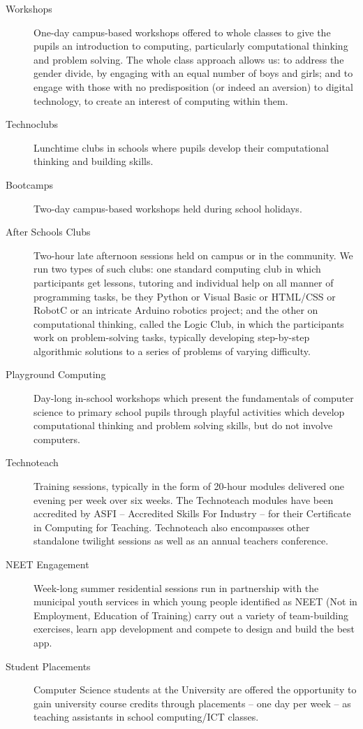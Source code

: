 \documentclass{sig-alternate}
\begin{document}
\begin{description}
\item[Workshops]
One-day campus-based workshops offered to whole classes
to give the pupils an introduction to computing,
particularly computational thinking and problem solving.
The whole class approach allows us: to address the gender divide,
by engaging with an equal number of boys and girls;
and to engage with those with no predisposition (or indeed an aversion)
to digital technology, to create an interest of computing within them.
\item[Technoclubs]
Lunchtime clubs in schools where pupils develop
their computational thinking and building skills.
\item[Bootcamps]
Two-day campus-based workshops held during school holidays.
\item[After Schools Clubs]
Two-hour late afternoon sessions held on campus or in the community.
We run two types of such clubs: one standard computing club
in which participants get lessons, tutoring and individual help
on all manner of programming tasks, be they Python or Visual Basic
or HTML/CSS or RobotC or an intricate Arduino robotics project;
and the other on computational thinking, called the Logic Club,
in which the participants work on problem-solving tasks,
typically developing step-by-step algorithmic solutions
to a series of problems of varying difficulty.
\item[Playground Computing]
Day-long in-school workshops which present
the fundamentals of computer science to primary school pupils
through playful activities which develop computational thinking
and problem solving skills, but do not involve computers.
\item[Technoteach]
Training sessions, typically in the form of 20-hour modules
delivered one evening per week over six weeks.
The Technoteach modules have been accredited by ASFI
-- Accredited Skills For Industry --
for their Certificate in Computing for Teaching.
Technoteach also encompasses other standalone twilight sessions
as well as an annual teachers conference.
\item[NEET Engagement]
Week-long summer residential sessions run in partnership with
the municipal youth services in which young people identified
as NEET (Not in Employment, Education of Training)
carry out a variety of team-building exercises,
learn app development and compete to design and build the best app.
\item[Student Placements]
Computer Science students at the University are offered
the opportunity to gain university course credits through
placements -- one day per week -- as teaching assistants
in school computing/ICT classes.
\end{description}
\end{document}
